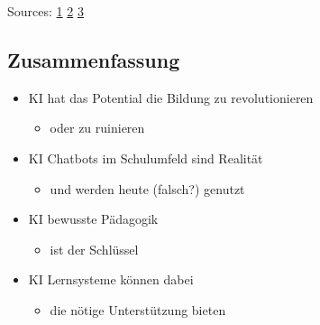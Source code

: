 \documentclass[
  letterpaper,
  DIV=11,
  numbers=noendperiod]{scrartcl}
\providecommand{\tightlist}{%
  \setlength{\itemsep}{0pt}\setlength{\parskip}{0pt}}\usepackage{longtable,booktabs,array}
\begin{document}
Sources:
\href{https://www.badische-zeitung.de/seit-30-jahren-wird-im-novartis-schullabor-in-basel-neugier-auf-wissenschaft-geweckt}{1}
\href{https://www.evim.de/news-veranstaltungen/news-und-veranstaltungen/detail-meldungen/hoehenflug-fuer-schueler-der-technik-werkstatt/}{2}
\href{https://freie-landschule.de/wp-content/uploads/2024/03/Holzwerkstatt_2-1-2048x1536.webp}{3}

\subsection{Zusammenfassung}\label{zusammenfassung}

\begin{itemize}
\tightlist
\item
  KI hat das Potential die Bildung zu revolutionieren

  \begin{itemize}
  \tightlist
  \item
    oder zu ruinieren
  \end{itemize}
\item
  KI Chatbots im Schulumfeld sind Realität

  \begin{itemize}
  \tightlist
  \item
    und werden heute (falsch?) genutzt
  \end{itemize}
\item
  KI bewusste Pädagogik

  \begin{itemize}
  \tightlist
  \item
    ist der Schlüssel
  \end{itemize}
\item
  KI Lernsysteme können dabei

  \begin{itemize}
  \tightlist
  \item
    die nötige Unterstützung bieten
  \end{itemize}
\end{itemize}
\end{document}
